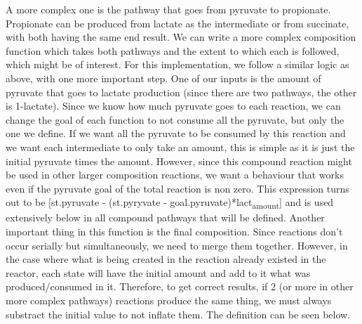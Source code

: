 \documentclass[11pt]{article}
\begin{document}
A more complex one is the pathway that goes from pyruvate to propionate. Propionate can be produced from lactate as the intermediate or from succinate, with both having the same end result. We can write a more complex composition function which takes both pathways and the extent to which each is followed, which might be of interest. For this implementation, we follow a similar logic as above, with one more important step. One of our inputs is the amount of pyruvate that goes to lactate production (since there are two pathways, the other is 1-lactate). Since we know how much pyruvate goes to each reaction, we can change the goal of each function to not consume all the pyruvate, but only the one we define. If we want all the pyruvate to be consumed by this reaction and we want each intermediate to only take an amount, this is simple as it is just the initial pyruvate times the amount. However, since this compound reaction might be used in other larger composition reactions, we want a behaviour that works even if the pyruvate goal of the total reaction is non zero. This expression turns out to be [st.pyruvate - (st.pyryvate - goal.pyruvate)*lact\textsubscript{amount}] and is used extensively below in all compound pathways that will be defined. Another important thing in this function is the final composition. Since reactions don't occur serially but simultaneously, we need to merge them together. However, in the case where what is being created in the reaction already existed in the reactor, each state will have the initial amount and add to it what was produced/consumed in it. Therefore, to get correct results, if 2 (or more in other more complex pathways) reactions produce the same thing, we must always substract the initial value to not inflate them. The definition can be seen below.
\end{document}

